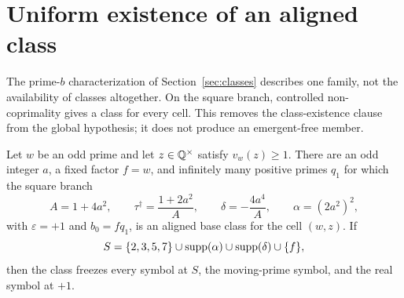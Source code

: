 \section{Uniform existence of an aligned class}
\label{sec:existence}

The prime-$b$ characterization of Section~\ref{sec:classes} describes one
family, not the availability of classes altogether.  On the square branch,
controlled non-coprimality gives a class for every cell.  This removes the
class-existence clause from the global hypothesis; it does not produce an
emergent-free member.

\begin{theorem}
\label{thm:classexist}
Let $w$ be an odd prime and let $z\in\mathbb{Q}^\times$ satisfy $v_w(z)\geq1$.
There are an odd integer $a$, a fixed factor $f=w$, and infinitely many
positive primes $q_1$ for which the square branch
\[
 A=1+4a^2,\qquad
 \tau^\dagger=\frac{1+2a^2}{A},\qquad
 \delta=-\frac{4a^4}{A},\qquad
 \alpha=(2a^2)^2,
\]
with $\varepsilon=+1$ and $b_0=fq_1$, is an aligned base class for the
cell $(w,z)$.  If
\[
 S=\{2,3,5,7\}\cup\operatorname{supp}(\alpha)\cup\operatorname{supp}(\delta)\cup\{f\},
\]
then the class freezes every symbol at $S$, the moving-prime symbol, and
the real symbol at $+1$.
\end{theorem}

